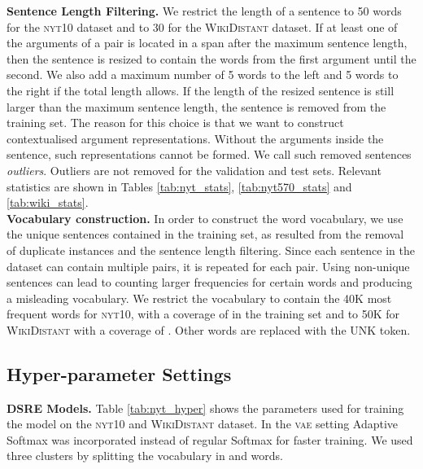 \documentclass[11pt]{article}
\begin{document}
\noindent \textbf{Sentence Length Filtering.} 
We restrict the length of a sentence to 50 words for the \textsc{nyt10} dataset and to 30 for the \textsc{WikiDistant} dataset.
If at least one of the arguments of a pair is located in a span after the maximum sentence length, then the sentence is resized to contain the words from the first argument until the second. We also add a maximum number of 5 words to the left and 5 words to the right if the total length allows. 
If the length of the resized sentence is still larger than the maximum sentence length, the sentence is removed from the training set.
The reason for this choice is that we want to construct contextualised argument representations. Without the arguments inside the sentence, such representations cannot be formed. We call such removed sentences \textit{outliers}.
Outliers are not removed for the validation and test sets. 
Relevant statistics are shown in Tables \ref{tab:nyt_stats}, \ref{tab:nyt570_stats} and \ref{tab:wiki_stats}. \\


\noindent \textbf{Vocabulary construction.} 
In order to construct the word vocabulary, we use the unique sentences contained in the training set, as resulted from the removal of duplicate instances and the sentence length filtering. 
Since each sentence in the dataset can contain multiple pairs, it is repeated for each pair. 
Using non-unique sentences can lead to counting larger frequencies for certain words and producing a misleading vocabulary. 
We restrict the vocabulary to contain the 40K most frequent words for \textsc{nyt10}, with a coverage of  in the training set and to 50K for \textsc{WikiDistant} with a coverage of .
Other words are replaced with the UNK token.



\subsection{Hyper-parameter Settings}

\textbf{DSRE Models.}
Table \ref{tab:nyt_hyper} shows the parameters used for training the model on the \textsc{nyt10} and \textsc{WikiDistant} dataset. 
In the \textsc{vae} setting Adaptive Softmax \citep{grave2017adaptive} was incorporated instead of regular Softmax for faster training. We used three clusters by splitting the vocabulary in
 and  words. \\
\end{document}
